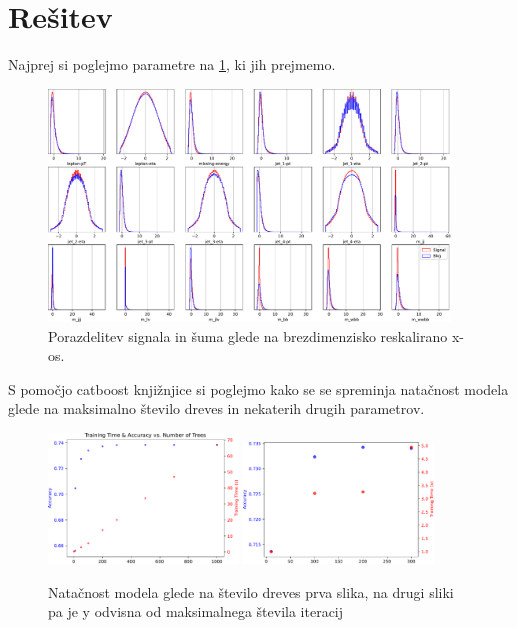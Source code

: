 \section{Rešitev}

Najprej si poglejmo parametre na \ref{fig:dist-sig-bkg}, ki jih prejmemo.
\begin{figure}[h]
    \centering
    \includegraphics[width=0.95\textwidth]{../pdf/dist-sig-bkg.pdf}
    \caption{Porazdelitev signala in šuma glede na brezdimenzisko reskalirano x-os.\label{fig:dist-sig-bkg}}
\end{figure}


S pomočjo catboost knjižnjice si poglejmo kako se se spreminja natačnost modela glede na maksimalno število dreves in nekaterih drugih parametrov.
\begin{figure}[h]
    \centering
    \includegraphics[width=0.45\textwidth]{../pdf/catboost_trees_vs_time_accuracy.pdf}
    \includegraphics[width=0.45\textwidth]{../pdf/itter_time.pdf}
    \caption{Natačnost modela glede na število dreves prva slika, na drugi sliki pa je y odvisna od maksimalnega števila iteracij\label{fig:catboost-accuracy}}
\end{figure}


